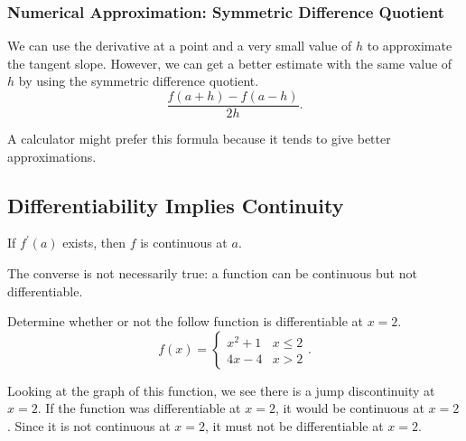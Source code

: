 \subsubsection{Numerical Approximation: Symmetric Difference Quotient}
We can use the derivative at a point and a very small value of $h$ to approximate the tangent slope.
However, we can get a better estimate with the same value of $h$ by using the symmetric difference quotient.
\begin{equation*}
	\frac{f(a+h)-f(a-h)}{2h}.
\end{equation*}

A calculator might prefer this formula because it tends to give better approximations.

\subsection{Differentiability Implies Continuity}
\begin{theorem}
	If $f^\prime(a)$ exists, then $f$ is continuous at $a$.
\end{theorem}

The converse is not necessarily true: a function can be continuous but not differentiable.

\begin{example}
	Determine whether or not the follow function is differentiable at $x=2$.
	\begin{equation*}
		f(x) = \begin{cases}
			x^2 + 1 & x \leq 2 \\
			4x-4 & x > 2
		\end{cases}.
	\end{equation*}
\end{example}
\begin{answer}
	Looking at the graph of this function, we see there is a jump discontinuity at $x=2$.
	If the function was differentiable at $x=2$, it would be continuous at $x=2$.
	Since it is not continuous at $x=2$, it must not be differentiable at $x=2$.
\end{answer}